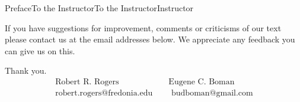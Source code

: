 \documentclass[oneside,10pt,]{book}
\numberwithin{equation}{part}
\newcommand{\amp}{&}
\begin{document}
\begin{preface}{Preface}{To the Instructor}{}{To the Instructor}{}{}{Instructor}
\par
If you have suggestions for improvement, comments or criticisms of our text please contact us at the email addresses below.  We appreciate any feedback you can give us on this.%
\par
Thank you.%
\begin{equation*}
\begin{array}{lcl} \text{ Robert R. Rogers } \amp \amp \text{
Eugene C. Boman } \\ \text{ robert.rogers@fredonia.edu } \amp
\amp \text{ budboman@gmail.com } \end{array}
\end{equation*}
%
\end{preface}
\setcounter{tocdepth}{0}
\renewcommand*\contentsname{Contents}
\tableofcontents
\mainmatter
%
%
\typeout{************************************************}
\typeout{************************************************}
%
\end{document}
